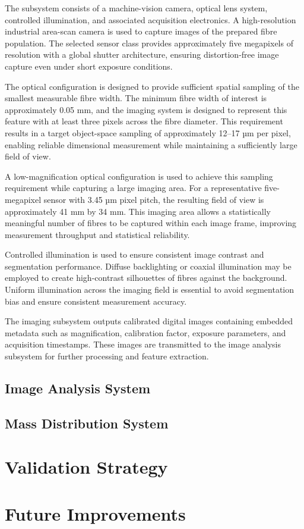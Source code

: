 \documentclass[a4paper, 12pt, english]{article}
\begin{document}
The subsystem consists of a machine-vision camera, optical lens system, controlled illumination, and associated acquisition electronics. A high-resolution industrial area-scan camera is used to capture images of the prepared fibre population. The selected sensor class provides approximately five megapixels of resolution with a global shutter architecture, ensuring distortion-free image capture even under short exposure conditions.

The optical configuration is designed to provide sufficient spatial sampling of the smallest measurable fibre width. The minimum fibre width of interest is approximately 0.05 mm, and the imaging system is designed to represent this feature with at least three pixels across the fibre diameter. This requirement results in a target object-space sampling of approximately 12–17 µm per pixel, enabling reliable dimensional measurement while maintaining a sufficiently large field of view.

A low-magnification optical configuration is used to achieve this sampling requirement while capturing a large imaging area. For a representative five-megapixel sensor with 3.45 µm pixel pitch, the resulting field of view is approximately 41 mm by 34 mm. This imaging area allows a statistically meaningful number of fibres to be captured within each image frame, improving measurement throughput and statistical reliability.

Controlled illumination is used to ensure consistent image contrast and segmentation performance. Diffuse backlighting or coaxial illumination may be employed to create high-contrast silhouettes of fibres against the background. Uniform illumination across the imaging field is essential to avoid segmentation bias and ensure consistent measurement accuracy.

The imaging subsystem outputs calibrated digital images containing embedded metadata such as magnification, calibration factor, exposure parameters, and acquisition timestamps. These images are transmitted to the image analysis subsystem for further processing and feature extraction.

\subsection{Image Analysis System}

\subsection{Mass Distribution System}

\section{Validation Strategy}

\section{Future Improvements}
\end{document}
